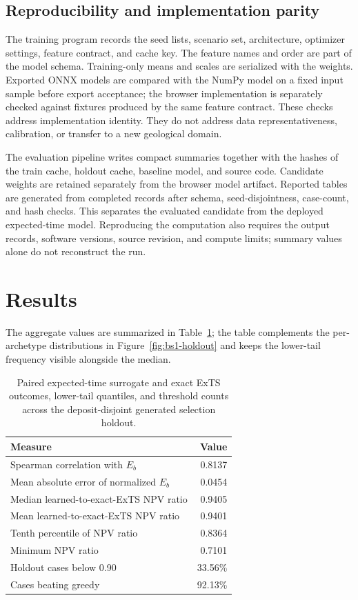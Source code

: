 \documentclass[11pt]{article}
\begin{document}
\subsection{Reproducibility and implementation parity}
The training program records the seed lists, scenario set, architecture, optimizer settings, feature contract, and cache key. The feature names and order are part of the model schema. Training-only means and scales are serialized with the weights. Exported ONNX models are compared with the NumPy model on a fixed input sample before export acceptance; the browser implementation is separately checked against fixtures produced by the same feature contract. These checks address implementation identity. They do not address data representativeness, calibration, or transfer to a new geological domain.

The evaluation pipeline writes compact summaries together with the hashes of the train cache, holdout cache, baseline model, and source code. Candidate weights are retained separately from the browser model artifact. Reported tables are generated from completed records after schema, seed-disjointness, case-count, and hash checks. This separates the evaluated candidate from the deployed expected-time model. Reproducing the computation also requires the output records, software versions, source revision, and compute limits; summary values alone do not reconstruct the run.
\clearpage
\section{Results}
The aggregate values are summarized in Table~\ref{tab:selection-summary}; the table complements the per-archetype distributions in Figure~\ref{fig:bs1-holdout} and keeps the lower-tail frequency visible alongside the median.
\begin{table}[h]
\centering
\caption{Paired expected-time surrogate and exact ExTS outcomes, lower-tail quantiles, and threshold counts across the deposit-disjoint generated selection holdout.}
\label{tab:selection-summary}
\begin{tabular}{lr}\toprule
Measure & Value \\\midrule
Spearman correlation with $E_b$ & 0.8137 \\
Mean absolute error of normalized $E_b$ & 0.0454 \\
Median learned-to-exact-ExTS NPV ratio & 0.9405 \\
Mean learned-to-exact-ExTS NPV ratio & 0.9401 \\
Tenth percentile of NPV ratio & 0.8364 \\
Minimum NPV ratio & 0.7101 \\
Holdout cases below 0.90 & 33.56\% \\
Cases beating greedy & 92.13\% \\
\bottomrule\end{tabular}
\end{table}
\end{document}
